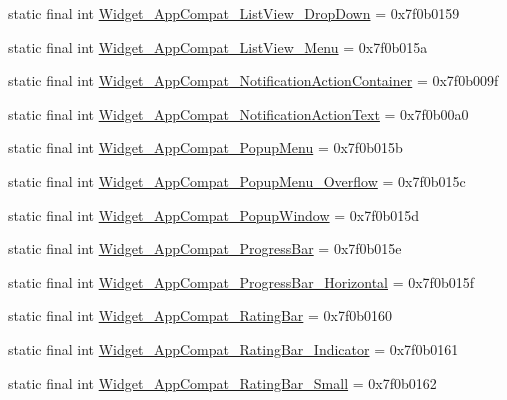 \begin{CompactItemize}
\item 
static final int \hyperlink{classcom_1_1companyname_1_1x__2doo_1_1_r_1_1style_1bee069e4fbed90e7b0485c6f4d25420}{Widget\_\-AppCompat\_\-ListView\_\-DropDown} = 0x7f0b0159
\item 
static final int \hyperlink{classcom_1_1companyname_1_1x__2doo_1_1_r_1_1style_82fadd5f9f180dedc977b27bff214375}{Widget\_\-AppCompat\_\-ListView\_\-Menu} = 0x7f0b015a
\item 
static final int \hyperlink{classcom_1_1companyname_1_1x__2doo_1_1_r_1_1style_6861a63cd8f1d416feee9851cc3e127c}{Widget\_\-AppCompat\_\-NotificationActionContainer} = 0x7f0b009f
\item 
static final int \hyperlink{classcom_1_1companyname_1_1x__2doo_1_1_r_1_1style_0d1df88288e9f434cb15b2e30437c18a}{Widget\_\-AppCompat\_\-NotificationActionText} = 0x7f0b00a0
\item 
static final int \hyperlink{classcom_1_1companyname_1_1x__2doo_1_1_r_1_1style_d89ab2e21fdeb4913362c0ce63d0d34c}{Widget\_\-AppCompat\_\-PopupMenu} = 0x7f0b015b
\item 
static final int \hyperlink{classcom_1_1companyname_1_1x__2doo_1_1_r_1_1style_a26e3db7eed59138c08db7f4145ae75b}{Widget\_\-AppCompat\_\-PopupMenu\_\-Overflow} = 0x7f0b015c
\item 
static final int \hyperlink{classcom_1_1companyname_1_1x__2doo_1_1_r_1_1style_f4c2e4817250f549143054563712ae4e}{Widget\_\-AppCompat\_\-PopupWindow} = 0x7f0b015d
\item 
static final int \hyperlink{classcom_1_1companyname_1_1x__2doo_1_1_r_1_1style_921575edccee20771a65b4ebd05dabbe}{Widget\_\-AppCompat\_\-ProgressBar} = 0x7f0b015e
\item 
static final int \hyperlink{classcom_1_1companyname_1_1x__2doo_1_1_r_1_1style_25ee291784644169318ca4f1eb827a72}{Widget\_\-AppCompat\_\-ProgressBar\_\-Horizontal} = 0x7f0b015f
\item 
static final int \hyperlink{classcom_1_1companyname_1_1x__2doo_1_1_r_1_1style_ec38d3439c346c59ec0f7e570d2f3ebe}{Widget\_\-AppCompat\_\-RatingBar} = 0x7f0b0160
\item 
static final int \hyperlink{classcom_1_1companyname_1_1x__2doo_1_1_r_1_1style_7e2b2275a105b254b54a165bc7e6685c}{Widget\_\-AppCompat\_\-RatingBar\_\-Indicator} = 0x7f0b0161
\item 
static final int \hyperlink{classcom_1_1companyname_1_1x__2doo_1_1_r_1_1style_3bfbac76c0fae847edbcc26f63d64e68}{Widget\_\-AppCompat\_\-RatingBar\_\-Small} = 0x7f0b0162
\item 

\end{CompactItemize}
